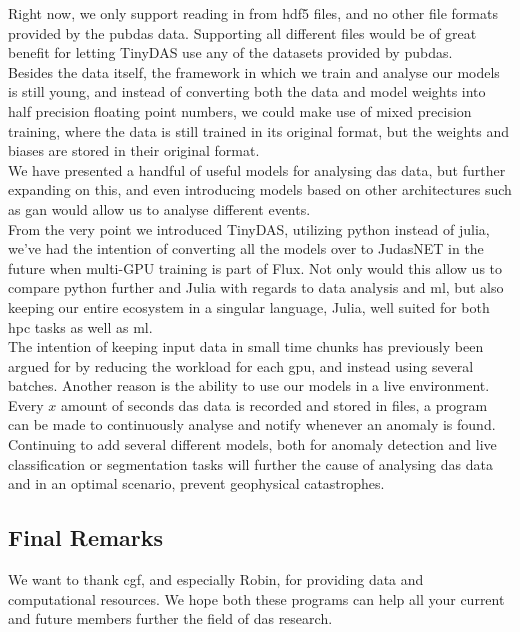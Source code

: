 Right now, we only support reading in from \acrshort{hdf5} files, and no other file formats provided by the \Gls{pubdas} data. Supporting all different files would be of great benefit for letting TinyDAS use any of the datasets provided by \acrshort{pubdas}. \\

Besides the data itself, the framework in which we train and analyse our models is still young, and instead of converting both the data and model weights into half precision floating point numbers, we could make use of mixed precision training, where the data is still trained in its original format, but the weights and biases are stored in their original format. \\

We have presented a handful of useful models for analysing \acrshort{das} data, but further expanding on this, and even introducing models based on other architectures such as \acrshort{gan} would allow us to analyse different events. \\

From the very point we introduced TinyDAS, utilizing \Gls{python} instead of \Gls{julia}, we've had the intention of converting all the models over to JudasNET in the future when multi-GPU training is part of Flux. Not only would this allow us to compare python further and Julia with regards to data analysis and \acrshort{ml}, but also keeping our entire ecosystem in a singular language, Julia, well suited for both \acrshort{hpc} tasks as well as \acrshort{ml}.  \\

The intention of keeping input data in small time chunks has previously been argued for by reducing the workload for each \acrshort{gpu}, and instead using several batches. Another reason is the ability to use our models in a live environment. Every $x$ amount of seconds \acrshort{das} data is recorded and stored in files, a program can be made to continuously analyse and notify whenever an anomaly is found. \\

Continuing to add several different models, both for anomaly detection and live classification or segmentation tasks will further the cause of analysing \acrshort{das} data and in an optimal scenario, prevent geophysical catastrophes.

\subsection{Final Remarks}

We want to thank \acrfull{cgf}, and especially Robin, for providing data and computational resources. We hope both these programs can help all your current and future members further the field of \acrshort{das} research.
